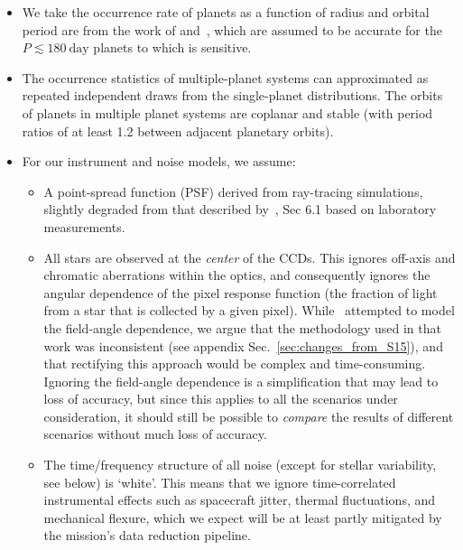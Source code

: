 \begin{itemize}
	\item We take the occurrence rate of planets as a function of radius
          and orbital period are from the work of \citet{fressin_false_2013}
          and~\citet{dressing_occurrence_2015}, which are assumed to be
          accurate for the $P \lesssim 180\ \text{day}$ planets to
          which \tess is sensitive.
          
	\item The occurrence statistics of multiple-planet systems can
          approximated as repeated independent draws from the
          single-planet distributions. The orbits of planets in
          multiple planet systems are coplanar and stable (with period
          ratios of at least 1.2 between adjacent planetary orbits).
          
	\item For our instrument and noise models, we assume:
	  \begin{itemize}
            
	  \item A point-spread function (PSF) derived from ray-tracing
            simulations, slightly degraded from that described
            by~, Sec 6.1 based on laboratory
            measurements.
            
          \item All stars are observed at the \textit{center} of the
            \tess CCDs. This ignores off-axis and chromatic
            aberrations within the \tess optics, and consequently
            ignores the angular dependence of the pixel response
            function (the fraction of light from a star that is
            collected by a given pixel).
            While~ attempted to model the
            field-angle dependence, we argue that the methodology used
            in that work was inconsistent (see appendix
            Sec.~\ref{sec:changes_from_S15}), and that rectifying this
            approach would be complex and time-consuming. Ignoring the
            field-angle dependence is a simplification that may lead
            to loss of accuracy, but since this applies to all the
            scenarios under consideration, it should still be possible
            to {\it compare} the results of different scenarios
            without much loss of accuracy.
            
         \item The time/frequency structure of all noise (except for
           stellar variability, see below) is `white'.  This means
           that we ignore time-correlated instrumental effects such as
           spacecraft jitter, thermal fluctuations, and mechanical
           flexure, which we expect will be at least partly mitigated
           by the mission's data reduction pipeline.
                  

\end{itemize}
\end{itemize}
